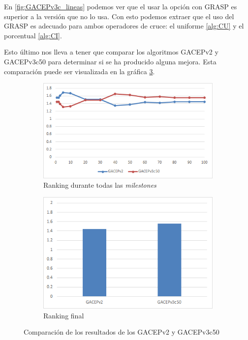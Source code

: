 En \ref{fig:GACEPv3c_lineas} podemos ver que el usar la opción con GRASP es superior a la versión que no lo usa. 
Con esto podemos extraer que el uso del GRASP es adecuado para ambos operadores de cruce: el uniforme \ref{alg:CU} y el porcentual \ref{alg:CI}. 

Esto último nos lleva a tener que comparar los algoritmos GACEPv2 y GACEPv3c50 para determinar si se ha producido alguna mejora. 
Esta comparación puede ser visualizada en la gráfica \ref{fig:GACEPv2vsGACEPv3}.

\begin{figure}[h]
     \centering
     \begin{subfigure}[b]{0.45\textwidth}
         \centering
         \includegraphics[width=\textwidth]{imagenes/Experimental/GACEPv2vsGACEPv3.png}
         \caption{Ranking durante todas las \textit{milestones}}
         \label{fig:GACEPv2vsGACEPv3_lineas}
     \end{subfigure}
     \hfill
     \begin{subfigure}[b]{0.45\textwidth}
         \centering
         \includegraphics[width=\textwidth]{imagenes/Experimental/barras/GACEPv2vsGACEPv3.png}
         \caption{Ranking final}
         \label{fig:GACEPv2vsGACEPv3_barras}
     \end{subfigure}
        \caption{Comparación de los resultados de los GACEPv2 y GACEPv3c50}
        \label{fig:GACEPv2vsGACEPv3}
\end{figure}

